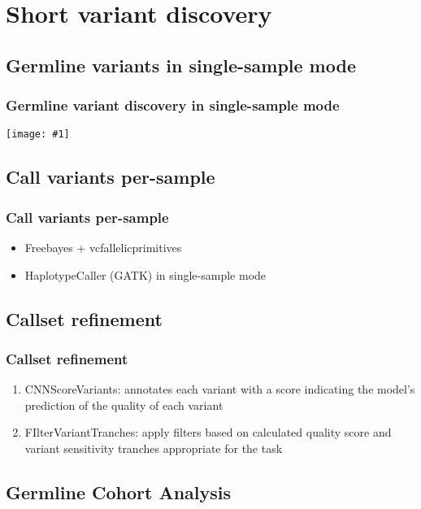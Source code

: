 \documentclass{beamer}
\newcommand {\framedgraphic}[1] {
\begin{center}
\texttt{[image: \#1]}
\end{center}
}
\begin{document}
\section{Short variant discovery}

\subsection{Germline variants in single-sample mode}

\begin{frame}
\frametitle{Germline variant discovery in single-sample mode}
\framedgraphic{single_pipeline.png}
\end{frame}

\subsection{Call variants per-sample}

\begin{frame}
\frametitle{Call variants per-sample}

\begin{itemize}
\item Freebayes + vcfallelicprimitives
\item HaplotypeCaller (GATK) in single-sample mode
\end{itemize}

\end{frame}

\subsection{Callset refinement}

\begin{frame}
\frametitle{Callset refinement}

\begin{enumerate}
\item CNNScoreVariants: annotates each variant with a score indicating the model's prediction of the quality of each variant
\item FIlterVariantTranches: apply filters based on calculated quality score and variant sensitivity tranches appropriate for the task
\end{enumerate}

\end{frame}

\subsection{Germline Cohort Analysis}
\end{document}
